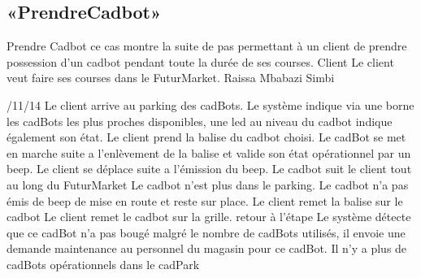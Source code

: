 \subsection{«PrendreCadbot»}
\startCU
\nom Prendre Cadbot
\but ce cas montre la suite de pas permettant à un client de prendre possession d'un cadbot pendant toute la durée de ses courses.
\acteur Client
\precondition Le client veut faire ses courses dans le FuturMarket.
\auteur Raissa Mbabazi Simbi
\date 7/11/14
\nominal %
\startnominal
\etape[PC:SA1] Le client arrive au parking des cadBots.
\etape[PC:RETOUR] Le système indique via une borne les cadBots les plus proches disponibles, une led au niveau du cadbot indique également son état.
\etape[PC:SE1] Le client prend la balise du cadbot choisi.
\etape Le cadBot se met en marche suite a l'enlèvement de la balise et valide son état opérationnel par un beep.
\etape Le client se déplace suite a l'émission du beep.
\etape Le cadbot suit le client tout au long du FuturMarket
\stopnominal
\postcondition Le cadbot n'est plus dans le parking.
\alternatifs
\startalternatif[PC:SE1] %
\etape Le cadbot n'a pas émis de beep de mise en route et reste sur place.
\etape Le client remet la balise sur le cadbot
\etape Le client remet le cadbot sur la grille.
\etape retour à l'étape \in[PC:RETOUR]
\stopcondition
\postcondition Le système détecte que ce cadBot n'a pas bougé malgré le nombre de cadBots utilisés, il envoie une demande maintenance au personnel du magasin pour ce cadBot.
\stopalternatif
\exception
Il n'y a plus de cadBots opérationnels dans le cadPark
\stopCU
